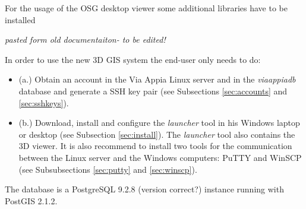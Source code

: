 For the usage of the OSG desktop viewer some additional libraries have to be installed




{\em pasted form old documentaiton- to be edited!}
 
In order to use the new 3D GIS system the end-user only needs to do:
\begin{itemize}
\item (a.) Obtain an account in the Via Appia Linux server and in the \textit{viaappiadb} database and generate a SSH key pair (see Subsections \ref{sec:accounts} and \ref{sec:sshkeys}).
\item (b.) Download, install and configure the \textit{launcher} tool in his Windows laptop or desktop (see Subsection \ref{sec:install}).  The \textit{launcher} tool also contains the 3D viewer. It is also recommend to install two tools for the communication between the Linux server and the Windows computers: PuTTY and WinSCP (see Subsubsections \ref{sec:putty} and \ref{sec:winscp}).
\end{itemize}

 The database is a PostgreSQL 9.2.8 (version correct?) instance running with PostGIS 2.1.2.